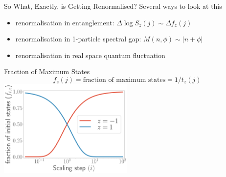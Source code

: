 \documentclass[12pt,aspectratio=169]{beamer}
\begin{document}
\begin{frame}{So What, Exactly, is Getting Renormalised?}
	Several ways to look at this\\[10pt]
	\begin{itemize}
		\item renormalisation in \alert{entanglement}: \(\Delta \log S_z(j) \sim \Delta f_z(j) \)\\[10pt]
		\item renormalisation in 1-particle \alert{spectral gap}: \(M(n,\phi) \sim |n + \phi|\)\\[10pt]
		\item renormalisation in real space \alert{quantum fluctuation}\\[10pt]
	\end{itemize}
\end{frame}

\begin{frame}{Fraction of Maximum States}
	\centering
	\[f_z(j) = \text{fraction of maximum states} = 1/t_z(j)\]
	\includegraphics[width=0.5\textwidth]{figures/fraction.pdf}
\end{frame}
\end{document}

